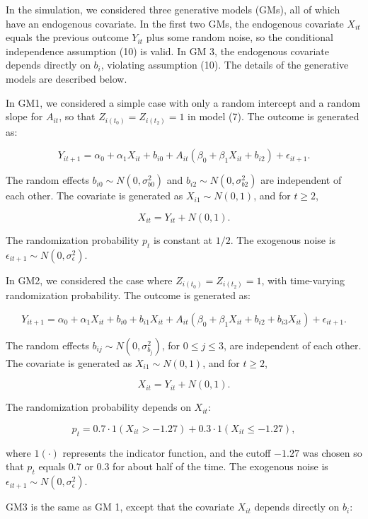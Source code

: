 \documentclass[
  12pt,
  a4paper,
]{article}
\begin{document}
In the simulation, we considered three generative models (GMs), all of
which have an endogenous covariate. In the first two GMs, the endogenous
covariate \(X_{it}\) equals the previous outcome \(Y_{it}\) plus some
random noise, so the conditional independence assumption (10) is valid.
In GM 3, the endogenous covariate depends directly on \(b_i\), violating
assumption (10). The details of the generative models are described
below.

In GM1, we considered a simple case with only a random intercept and a
random slope for \(A_{it}\), so that \(Z_{i(t_0)} = Z_{i(t_2)} = 1\) in
model (7). The outcome is generated as:

\[
Y_{it+1} = \alpha_0 + \alpha_1 X_{it} + b_{i0} + A_{it} (\beta_0 + \beta_1 X_{it} + b_{i2}) + \epsilon_{it+1}.
\]

The random effects \(b_{i0} \sim N(0, \sigma_{b0}^2)\) and
\(b_{i2} \sim N(0, \sigma_{b2}^2)\) are independent of each other. The
covariate is generated as \(X_{i1} \sim N(0, 1)\), and for \(t \geq 2\),

\[
X_{it} = Y_{it} + N(0, 1).
\]

The randomization probability \(p_t\) is constant at \(1/2\). The
exogenous noise is \(\epsilon_{it+1} \sim N(0, \sigma_\epsilon^2)\).

In GM2, we considered the case where \(Z_{i(t_0)} = Z_{i(t_2)} = 1\),
with time-varying randomization probability. The outcome is generated
as:

\[
Y_{it+1} = \alpha_0 + \alpha_1 X_{it} + b_{i0} + b_{i1} X_{it} + A_{it} (\beta_0 + \beta_1 X_{it} + b_{i2} + b_{i3} X_{it}) + \epsilon_{it+1}.
\]

The random effects \(b_{ij} \sim N(0, \sigma_{b_j}^2)\), for
\(0 \leq j \leq 3\), are independent of each other. The covariate is
generated as \(X_{i1} \sim N(0, 1)\), and for \(t \geq 2\),

\[
X_{it} = Y_{it} + N(0, 1).
\]

The randomization probability depends on \(X_{it}\):

\[
p_t = 0.7 \cdot 1(X_{it} > -1.27) + 0.3 \cdot 1(X_{it} \leq -1.27),
\]

where \(1(\cdot)\) represents the indicator function, and the cutoff
\(-1.27\) was chosen so that \(p_t\) equals 0.7 or 0.3 for about half of
the time. The exogenous noise is
\(\epsilon_{it+1} \sim N(0, \sigma_\epsilon^2)\).

GM3 is the same as GM 1, except that the covariate \(X_{it}\) depends
directly on \(b_i\):
\end{document}

